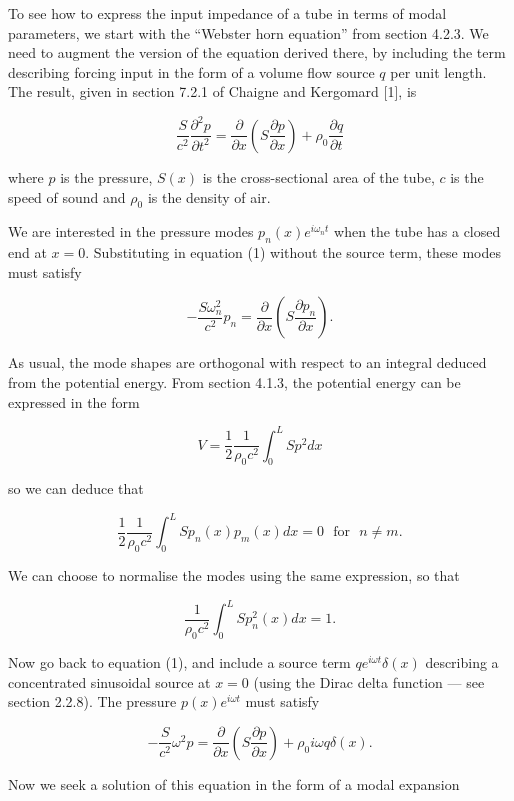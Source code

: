   To see how to express the input impedance of a tube in terms of modal 
  parameters, we start with the ``Webster horn equation'' from section 4.2.3. 
  We need to augment the version of the equation derived there, by including 
  the term describing forcing input in the form of a volume flow source $q$ per 
  unit length. The result, given in section 7.2.1 of Chaigne and Kergomard [1], 
  is 

  $$\dfrac{S}{c^2} \dfrac{\partial^2 p}{\partial t^2} = 
  \dfrac{\partial}{\partial x}\left(S\dfrac{\partial p}{\partial x} \right) + 
  \rho_0 \dfrac{\partial q}{\partial t} \tag{1}$$ 

  where $p$ is the pressure, $S(x)$ is the cross-sectional area of the tube, 
  $c$ is the speed of sound and $\rho_0$ is the density of air. 

  We are interested in the pressure modes $p_n(x) e^{i \omega_n t}$ when the 
  tube has a closed end at $x=0$. Substituting in equation (1) without the 
  source term, these modes must satisfy 

  $$-\frac{S \omega_n^2}{c^2}p_n = \dfrac{\partial}{\partial 
  x}\left(S\dfrac{\partial p_n}{\partial x} \right) . \tag{2}$$ 

  As usual, the mode shapes are orthogonal with respect to an integral deduced 
  from the potential energy. From section 4.1.3, the potential energy can be 
  expressed in the form 

  $$V=\dfrac{1}{2} \dfrac{1}{\rho_0 c^2} \int_0^L{S p^2 dx} \tag{3}$$ 

  so we can deduce that 

  $$\dfrac{1}{2} \dfrac{1}{\rho_0 c^2} \int_0^L{S p_n(x) p_m(x) dx} = 0 
  \mathrm{~~~for~~~} n \ne m . \tag{4}$$ 

  We can choose to normalise the modes using the same expression, so that 

  $$\dfrac{1}{\rho_0 c^2} \int_0^L{S p_n^2(x) dx} = 1. \tag{5}$$ 

  Now go back to equation (1), and include a source term $q e^{i \omega t} 
  \delta(x)$ describing a concentrated sinusoidal source at $x=0$ (using the 
  Dirac delta function --- see section 2.2.8). The pressure $p(x) e^{i \omega 
  t}$ must satisfy 

  $$-\dfrac{S}{c^2} \omega^2 p = \dfrac{\partial}{\partial 
  x}\left(S\dfrac{\partial p}{\partial x} \right) + \rho_0 i \omega q 
  \delta(x). \tag{6}$$ 

  Now we seek a solution of this equation in the form of a modal expansion 

